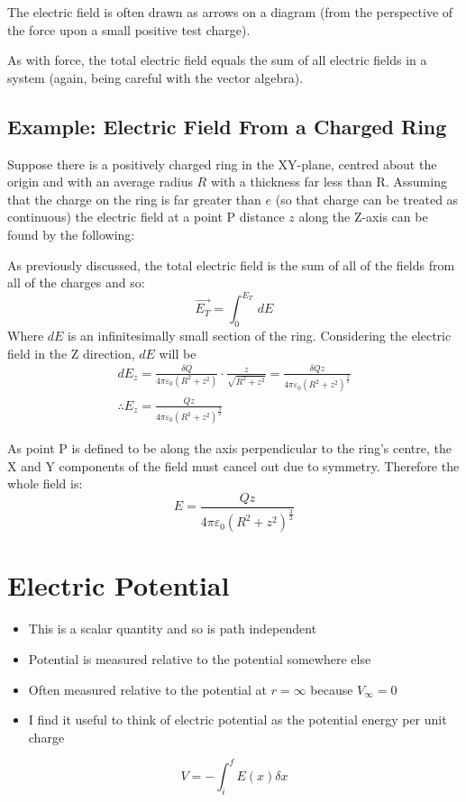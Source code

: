 \documentclass[11pt,a4paper]{report}
\begin{document}
The electric field is often drawn as arrows on a diagram (from the perspective of the force upon a small positive test charge).

As with force, the total electric field equals the sum of all electric fields in a system (again, being careful with the vector algebra).

\subsection{Example: Electric Field From a Charged Ring}
Suppose there is a positively charged ring in the XY-plane, centred about the origin and with an average radius $R$ with a thickness far less than R. Assuming that the charge on the ring is far greater than $e$ (so that charge can be treated as continuous) the electric field at a point P distance $z$ along the Z-axis can be found by the following:

As previously discussed, the total electric field is the sum of all of the fields from all of the charges and so:
\begin{equation*}
\vec{E_T} = \int_0^{E_T}\, dE
\end{equation*}
Where $dE$ is an infinitesimally small section of the ring. Considering the electric field in the Z direction, $dE$ will be
\begin{eqnarray*}
	dE_z = \frac{\delta Q}{4\pi\varepsilon_0(R^2+z^2)}\cdot\frac{z}{\sqrt{R^2+z^2}} = \frac{\delta Qz}{4\pi\varepsilon_0(R^2+z^2)^{\frac{3}{2}}} \\
	\therefore E_z = \frac{Qz}{4\pi\varepsilon_0(R^2+z^2)^{\frac{3}{2}}}
\end{eqnarray*}

As point P is defined to be along the axis perpendicular to the ring's centre, the X and Y components of the field must cancel out due to symmetry. Therefore the whole field is:
\begin{equation*}
	E = \frac{Qz}{4\pi\varepsilon_0(R^2+z^2)^{\frac{3}{2}}}
\end{equation*}

\section{Electric Potential}
\begin{itemize}
	\item This is a scalar quantity and so is path independent
	\item Potential is measured relative to the potential somewhere else
	\item Often measured relative to the potential at $r=\infty$ because $V_\infty=0$
	\item I find it useful to think of electric potential as the potential energy per unit charge
\end{itemize}
\begin{equation*}
	V = - \int_i^f E(x)\delta x
\end{equation*}
\end{document}
